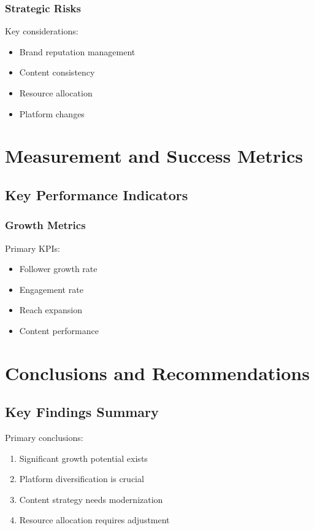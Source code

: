 \documentclass[12pt]{report}
\begin{document}
\subsection{Strategic Risks}
Key considerations:
\begin{itemize}
    \item Brand reputation management
    \item Content consistency
    \item Resource allocation
    \item Platform changes
\end{itemize}

\chapter{Measurement and Success Metrics}

\section{Key Performance Indicators}
\subsection{Growth Metrics}
Primary KPIs:
\begin{itemize}
    \item Follower growth rate
    \item Engagement rate
    \item Reach expansion
    \item Content performance
\end{itemize}

\chapter{Conclusions and Recommendations}

\section{Key Findings Summary}
Primary conclusions:
\begin{enumerate}
    \item Significant growth potential exists
    \item Platform diversification is crucial
    \item Content strategy needs modernization
    \item Resource allocation requires adjustment
\end{enumerate}
\end{document}
